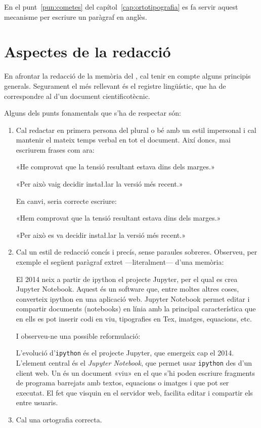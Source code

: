 \documentclass{tfgitic}[2024/07/01]
\begin{document}
En el punt~\ref{pun:cometes} del capítol~\ref{cap:ortotipografia} es
fa servir aquest mecanisme per escriure un paràgraf en anglès.

\chapter{Aspectes de la redacció}

En afrontar la redacció de la memòria del , cal tenir en
compte alguns principis generals. Segurament el més rellevant és el
registre lingüístic, que ha de correspondre al d'un document
cientificotècnic.

Alguns dels punts fonamentals que s'ha de respectar són:
\begin{enumerate}
\item Cal redactar en primera persona del plural o bé amb un estil
  impersonal i cal mantenir el mateix temps verbal en tot
  el document. Així doncs, mai escriurem frases com ara:
  \begin{displayquote}
    «He comprovat que la tensió resultant estava dins dels marges.»
  \end{displayquote}
  \begin{displayquote}
    «Per això vaig decidir insta\l.lar la versió més recent.»
  \end{displayquote}
  En canvi, seria correcte escriure:
  \begin{displayquote}
    «Hem comprovat que la tensió resultant estava dins dels marges.»
  \end{displayquote}
  \begin{displayquote}
    «Per això es va decidir insta\l.lar la versió més recent.»
  \end{displayquote}
\item Cal un estil de redacció concís i precís, sense paraules
  sobreres. Observeu, per exemple el següent paràgraf extret
  ---literalment--- d'una memòria:
  \begin{displayquote}
    El 2014 neix a partir de ipython el projecte Jupyter, per el qual
    es crea Jupyter Notebook.  Aquest és un software que, entre moltes
    altres coses, converteix ipython en una aplicació web.  Jupyter
    Notebook permet editar i compartir documents (notebooks) en línia
    amb la principal característica que en ells es pot inserir codi en
    viu, tipografies en Tex, imatges, equacions, etc.
  \end{displayquote}
  I observeu-ne una possible reformulació:
  \begin{displayquote}
    L'evolució d'\texttt{ipython} és el projecte Jupyter, que emergeix
    cap el 2014. L'element central és el \emph{Jupyter Notebook}, que
    permet usar \texttt{ipython} des d'un client web. Un 
    és un document «viu» en el que s'hi poden escriure fragments de
    programa barrejats amb textos, equacions o imatges i que pot ser
    executat. El fet que visquin en el servidor web, facilita editar i
    compartir els  entre usuaris.
  \end{displayquote}
\item Cal una ortografia correcta.
\end{enumerate}
\end{document}

